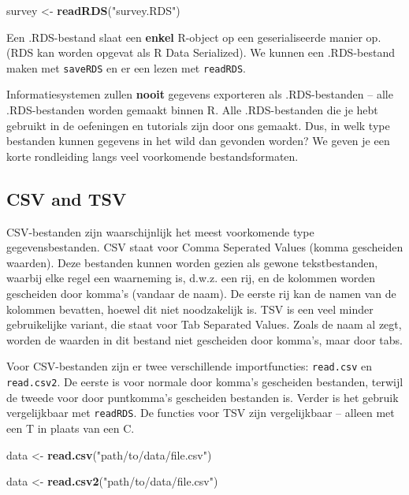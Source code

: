 \documentclass[]{tufte-book}
\newenvironment{Shaded}{}{}
\newcommand{\KeywordTok}[1]{\textcolor[rgb]{0.00,0.44,0.13}{\textbf{#1}}}
\newcommand{\NormalTok}[1]{#1}
\newcommand{\StringTok}[1]{\textcolor[rgb]{0.25,0.44,0.63}{#1}}
\begin{document}
\begin{Shaded}
\begin{Highlighting}[]
\NormalTok{survey <-}\StringTok{ }\KeywordTok{readRDS}\NormalTok{(}\StringTok{"survey.RDS"}\NormalTok{)}
\end{Highlighting}
\end{Shaded}

Een .RDS-bestand slaat een \textbf{enkel} R-object op een geserialiseerde manier op. (RDS kan worden opgevat als R Data Serialized). We kunnen een .RDS-bestand maken met \texttt{saveRDS} en er een lezen met \texttt{readRDS}.

Informatiesystemen zullen \textbf{nooit} gegevens exporteren als .RDS-bestanden -- alle .RDS-bestanden worden gemaakt binnen R. Alle .RDS-bestanden die je hebt gebruikt in de oefeningen en tutorials zijn door ons gemaakt. Dus, in welk type bestanden kunnen gegevens in het wild dan gevonden worden? We geven je een korte rondleiding langs veel voorkomende bestandsformaten.

\hypertarget{csv-and-tsv}{%
\subsection{CSV and TSV}\label{csv-and-tsv}}

CSV-bestanden zijn waarschijnlijk het meest voorkomende type gegevensbestanden. CSV staat voor Comma Seperated Values (komma gescheiden waarden). Deze bestanden kunnen worden gezien als gewone tekstbestanden, waarbij elke regel een waarneming is, d.w.z. een rij, en de kolommen worden gescheiden door komma's (vandaar de naam). De eerste rij kan de namen van de kolommen bevatten, hoewel dit niet noodzakelijk is. TSV is een veel minder gebruikelijke variant, die staat voor Tab Separated Values. Zoals de naam al zegt, worden de waarden in dit bestand niet gescheiden door komma's, maar door tabs.

Voor CSV-bestanden zijn er twee verschillende importfuncties: \texttt{read.csv} en \texttt{read.csv2}. De eerste is voor normale door komma's gescheiden bestanden, terwijl de tweede voor door puntkomma's gescheiden bestanden is. Verder is het gebruik vergelijkbaar met \texttt{readRDS}. De functies voor TSV zijn vergelijkbaar -- alleen met een T in plaats van een C.

\begin{Shaded}
\begin{Highlighting}[]
\NormalTok{data <-}\StringTok{ }\KeywordTok{read.csv}\NormalTok{(}\StringTok{"path/to/data/file.csv"}\NormalTok{)}

\NormalTok{data <-}\StringTok{ }\KeywordTok{read.csv2}\NormalTok{(}\StringTok{"path/to/data/file.csv"}\NormalTok{)}
\end{Highlighting}
\end{Shaded}
\end{document}
